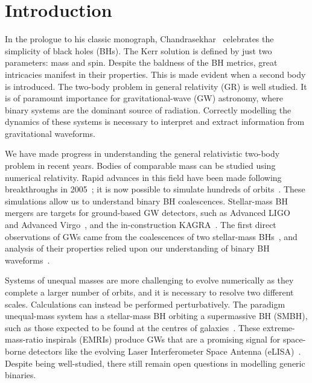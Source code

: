 \documentclass[aps,prd,amsfonts,amssymb,amsmath,nofootinbib,showpacs,superscriptaddress,twocolumn,floatfix]{revtex4-1}
\begin{document}
\maketitle

\section{Introduction}

In the prologue to his classic monograph, Chandrasekhar~\cite{Chandrasekhar1992} celebrates the simplicity of black holes (BHs). The Kerr solution is defined by just two parameters: mass and spin. Despite the baldness of the BH metrics, great intricacies manifest in their properties. This is made evident when a second body is introduced. The two-body problem in general relativity (GR) is well studied. It is of paramount importance for gravitational-wave (GW) astronomy, where binary systems are the dominant source of radiation. Correctly modelling the dynamics of these systems is necessary to interpret and extract information from gravitational waveforms.

We have made progress in understanding the general relativistic two-body problem in recent years. Bodies of comparable mass can be studied using numerical relativity. Rapid advances in this field have been made following breakthroughs in 2005~\cite{Pretorius2005,Campanelli2006,Baker2006}; it is now possible to simulate hundreds of orbits~\cite{Szilagyi2015}. These simulations allow us to understand binary BH coalescences. Stellar-mass BH mergers are targets for ground-based GW detectors, such as Advanced LIGO~\cite{Aasi2015} and Advanced Virgo~\cite{Acernese2015}, and the in-construction KAGRA~\cite{Aso2013}. The first direct observations of GWs came from the coalescences of two stellar-mass BHs~\cite{Abbott2016,Abbott2016e,Abbott2016d}, and analysis of their properties relied upon our understanding of binary BH waveforms~\cite{Abbott2016f,Abbott2016h,Abbott2016d}. %

Systems of unequal masses are more challenging to evolve numerically as they complete a larger number of orbits, and it is necessary to resolve two different scales. Calculations can instead be performed perturbatively. The paradigm unequal-mass system has a stellar-mass BH orbiting a supermassive BH (SMBH), such as those expected to be found at the centres of galaxies~\cite{Kormendy1995,Ferrarese2005,Boehle2016}. These extreme-mass-ratio inspirals (EMRIs) produce GWs that are a promising signal for space-borne detectors like the evolving Laser Interferometer Space Antenna (eLISA)~\cite{Amaro-Seoane2007,Amaro-Seoane2012a}. Despite being well-studied, there still remain open questions in modelling generic binaries.
\end{document}
